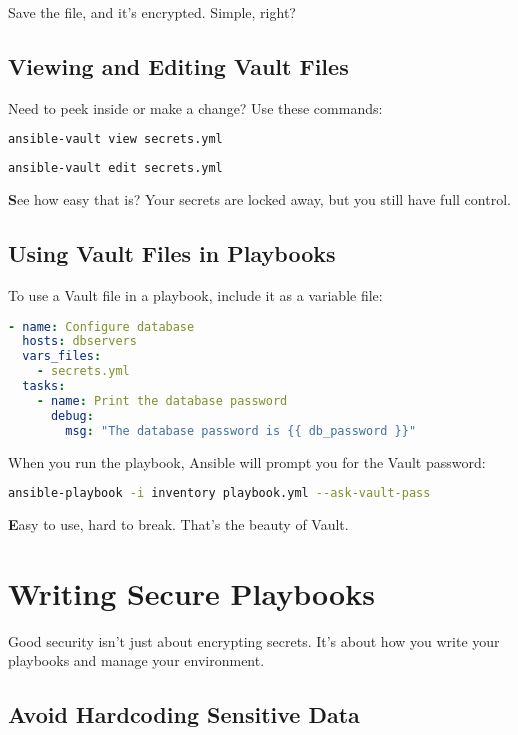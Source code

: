 Save the file, and it's encrypted. Simple, right?

\subsection{Viewing and Editing Vault Files}

Need to peek inside or make a change? Use these commands:
\begin{lstlisting}[language=bash, caption=Viewing a Vault File]
ansible-vault view secrets.yml
\end{lstlisting}
\begin{lstlisting}[language=bash, caption=Editing a Vault File]
ansible-vault edit secrets.yml
\end{lstlisting}

\textbf{S}ee how easy that is? Your secrets are locked away, but you still have full control.

\subsection{Using Vault Files in Playbooks}

To use a Vault file in a playbook, include it as a variable file:
\begin{lstlisting}[language=yaml, caption=Using a Vault File in a Playbook]
- name: Configure database
  hosts: dbservers
  vars_files:
    - secrets.yml
  tasks:
    - name: Print the database password
      debug:
        msg: "The database password is {{ db_password }}"
\end{lstlisting}

When you run the playbook, Ansible will prompt you for the Vault password:
\begin{lstlisting}[language=bash, caption=Running a Playbook with Vault]
ansible-playbook -i inventory playbook.yml --ask-vault-pass
\end{lstlisting}

\textbf{E}asy to use, hard to break. That's the beauty of Vault.


\section{Writing Secure Playbooks}

Good security isn't just about encrypting secrets. It's about how you write your playbooks and manage your environment.

\subsection{Avoid Hardcoding Sensitive Data}

